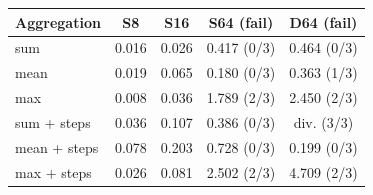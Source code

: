 \begin{tabular}{lcccc}\toprule
 Aggregation & S8 & S16 & S64 (fail) & D64 (fail) \\\midrule
sum & 0.016 & 0.026 & 0.417 (0/3) & 0.464 (0/3) \\
mean & 0.019 & 0.065 & 0.180 (0/3) & 0.363 (1/3) \\
max & 0.008 & 0.036 & 1.789 (2/3) & 2.450 (2/3) \\
sum + steps & 0.036 & 0.107 & 0.386 (0/3) & div. (3/3) \\
mean + steps & 0.078 & 0.203 & 0.728 (0/3) & 0.199 (0/3) \\
max + steps & 0.026 & 0.081 & 2.502 (2/3) & 4.709 (2/3) \\
\bottomrule\end{tabular}
